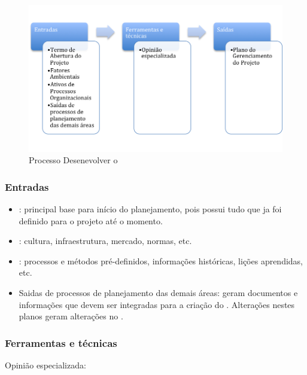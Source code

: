 \begin{figure}[!h]
\centering
\includegraphics[scale=0.75]{Figuras/proc_integracao_1.png}
\caption{Processo Desenevolver o \planproj}
\label{fig:proc:des:planproj}
\end{figure}

\subsubsection{Entradas}

\begin{itemize}

\item \termo: principal base para início do planejamento, pois possui tudo que ja foi definido para o projeto até o momento.

\item \amb: cultura, infraestrutura, mercado, normas, etc.

\item \ativ: processos e métodos pré-definidos, informações históricas, lições aprendidas, etc.

\item Saidas de processos de planejamento das demais áreas: geram documentos e informações que devem ser integradas para a criação do \planproj. Alterações nestes planos geram alterações no \planproj.

\end{itemize}

\subsubsection{Ferramentas e técnicas}

Opinião especializada:

